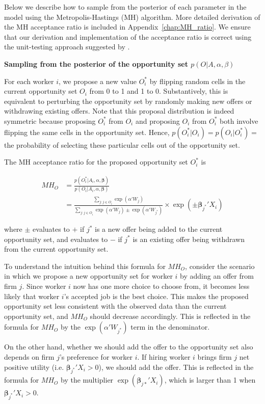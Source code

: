 Below we describe how to sample from the posterior of each parameter in the
model using the Metropolis-Hastings (MH) algorithm. More detailed derivation of
the MH acceptance ratio is included in Appendix~\ref{chap:MH_ratio}. We ensure
that our derivation and implementation of the acceptance ratio is correct using
the unit-testing approach suggested by \citet{Grosse2014}.

\textbf{Sampling from the posterior of the opportunity set $p(O|A, \alpha,
  \beta)$}

For each worker $i$, we propose a new value $O_i^*$ by flipping random cells in
the current opportunity set $O_i$ from 0 to 1 and 1 to 0. Substantively, this is
equivalent to perturbing the opportunity set by randomly making new offers or
withdrawing existing offers. Note that this proposal distribution is indeed
symmetric because proposing $O_i^*$ from $O_i$ and proposing $O_i$ from $O_i^*$
both involve flipping the same cells in the opportunity set. Hence,
$p(O_i^*|O_i) = p(O_i|O_i^*) =$ the probability of selecting these particular
cells out of the opportunity set.

The MH acceptance ratio for the proposed opportunity set $O_i^*$ is

\begin{align}
  MH_O &= \frac{p(O_i^* | A_i, \alpha, \bm{\beta})}{p(O_i | A_i, \alpha, \bm{\beta})} \\
       &= \frac{\sum\limits_{j:j \in O_i} \exp(\alpha'W_j)}{\sum\limits_{j:j \in O_i} \exp(\alpha'W_j) \pm \exp(\alpha' W_{j^*})} \times \exp(\pm \bm{\beta}_{j^*}'X_i)
\end{align}

where $\pm$ evaluates to $+$ if $j^*$ is a new offer being added to the current
opportunity set, and evaluates to $-$ if $j^*$ is an existing offer being
withdrawn from the current opportunity set.

To understand the intuition behind this formula for $MH_O$, consider the
scenario in which we propose a new opportunity set for worker $i$ by adding an
offer from firm $j$. Since worker $i$ now has one more choice to choose from, it
becomes less likely that worker $i$'s accepted job is the best choice. This
makes the proposed opportunity set less consistent with the observed data than
the current opportunity set, and $MH_O$ should decrease accordingly. This is
reflected in the formula for $MH_O$ by the $\exp(\alpha'W_{j^*})$ term in the
denominator.

On the other hand, whether we should add the offer to the opportunity set also
depends on firm $j$'s preference for worker $i$. If hiring worker $i$ brings
firm $j$ net positive utility (i.e. $\bm{\beta}_{j^*}'X_i > 0$), we should add
the offer. This is reflected in the formula for $MH_O$ by the multiplier
$\exp(\bm{\beta}_{j*}'X_i)$, which is larger than 1 when $\bm{\beta}_{j^*}'X_i >
0$.

